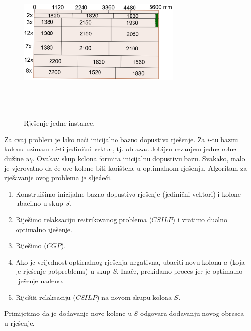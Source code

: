\documentclass[a4paper, utf8, 11pt, colorlinks]{book}
\theoremstyle{definition}
\begin{document}
 \begin{figure}[!ht]
     \centering
     \includegraphics[width=230pt, height=230pt]{cutting_stock.eps}
     \caption{Rješenje jedne instance.}
     \label{fig:cuting_stock_solutions}
 \end{figure}
 Za ovaj problem je lako naći inicijalno bazno dopustivo rješenje.
 Za $i$-tu baznu kolonu uzimamo $i$-ti jedinični vektor, tj. obrazac dobijen rezanjem jedne rolne dužine $w_i$. Ovakav skup kolona formira inicijalnu dopustivu bazu. Svakako, malo je vjerovatno da će ove kolone biti korištene u optimalnom rješenju. 
 Algoritam za rješavanje ovog problema je sljedeći.
 \begin{enumerate}
     \item Konstruišimo inicijalno bazno dopustivo rješenje (jedinični vektori) i kolone ubacimo u skup $S$.
     \item Riješimo relaksaciju restrikovanog problema ($CSILP$) i vratimo dualno optimalno rješenje. 
     \item Riješimo ($CGP$).
     \item Ako je vrijednost optimalnog rješenja negativna, ubaciti novu kolonu $a$ (koja je rješenje potproblema) u skup $S$. Inače, prekidamo proces jer je optimalno rješenje nađeno. 
     \item Riješiti relaksaciju ($CSILP$) na novom skupu kolona $S$.
 \end{enumerate}
 Primijetimo da je dodavanje nove kolone u $S$ odgovara dodavanju novog obrasca u rješenje. 
 
\end{document}
